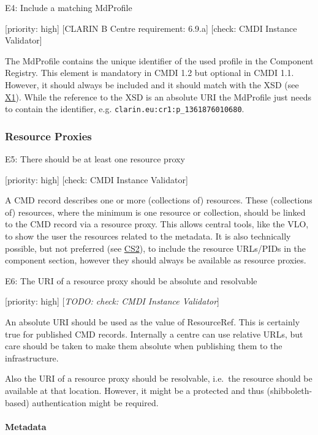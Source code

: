 \documentclass[]{article}
\let\oldparagraph\paragraph
\renewcommand{\paragraph}[1]{\oldparagraph{#1}\mbox{}}
\begin{document}
E4: Include a matching MdProfile

{[}priority: high{]} {[}CLARIN B Centre requirement: 6.9.a{]} {[}check:
CMDI Instance Validator{]}

The MdProfile contains the unique identifier of the used profile in the
Component Registry. This element is mandatory in CMDI 1.2 but optional
in CMDI 1.1. However, it should always be included and it should match
with the XSD (see
\href{/authoring_component_metadata_records/general_xml.md\#x1}{X1}).
While the reference to the XSD is an absolute URI the MdProfile just
needs to contain the identifier, e.g.
\texttt{clarin.eu:cr1:p\_1361876010680}.

\subsubsection{Resource Proxies}\label{resource-proxies}

E5: There should be at least one resource proxy

{[}priority: high{]} {[}check: CMDI Instance Validator{]}

A CMD record describes one or more (collections of) resources. These
(collections of) resources, where the minimum is one resource or
collection, should be linked to the CMD record via a resource proxy.
This allows central tools, like the VLO, to show the user the resources
related to the metadata. It is also technically possible, but not
preferred (see
\href{/authoring_component_metadata_records/the_component_section.md\#cs2}{CS2}),
to include the resource URLs/PIDs in the component section, however they
should always be available as resource proxies.

E6: The URI of a resource proxy should be absolute and resolvable

{[}priority: high{]} {[}\emph{TODO: check: CMDI Instance Validator}{]}

An absolute URI should be used as the value of ResourceRef. This is
certainly true for published CMD records. Internally a centre can use
relative URLs, but care should be taken to make them absolute when
publishing them to the infrastructure.

Also the URI of a resource proxy should be resolvable, i.e.~the resource
should be available at that location. However, it might be a protected
and thus (shibboleth-based) authentication might be required.

\paragraph{Metadata}\label{metadata}
\end{document}
